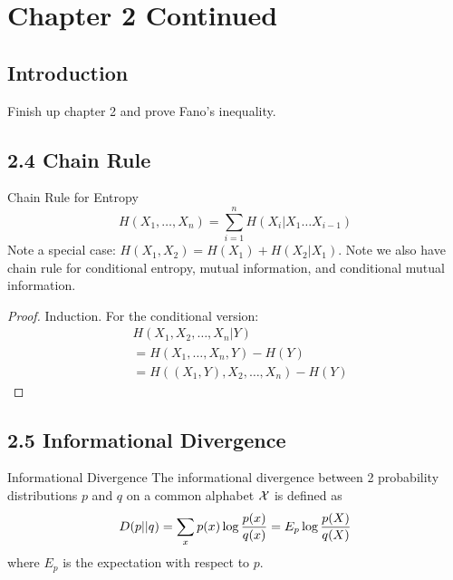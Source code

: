 \documentclass[../main.tex]{subfiles}
\begin{document}
\chapter{Chapter 2 Continued}
\section*{Introduction}
    Finish up chapter 2 and prove Fano's inequality.
\section{2.4 Chain Rule}
    \begin{bbox}{Chain Rule for Entropy}
        \begin{equation*}
            H(X_1,\dots,X_n)=\sum_{i=1}^{n}H(X_i|X_1\dots X_{i-1})
        \end{equation*}
        Note a special case: $H(X_1, X_2)=H(X_1)+H(X_2|X_1)$.
        Note we also have chain rule for conditional entropy, mutual information, and conditional mutual information.
        \begin{proof}
        Induction.
        For the conditional version:
            \begin{align*}
                &H(X_1,X_2,\dots,X_n|Y)\\
                &=H(X_1,\dots,X_n,Y)-H(Y)\\
                &=H((X_1,Y),X_2,\dots,X_n)-H(Y)
            \end{align*}    
        \end{proof}
    \end{bbox}

\section{2.5 Informational Divergence}
    
    \begin{gbox}{Informational Divergence}
        The informational divergence between 2 probability distributions $p$ and $q$ on a common alphabet $\mathcal{X}$ is defined as \begin{equation}
            D(p||q) = \sum_x p(x)\log\frac{p(x)}{q(x)} = E_p \log\frac{p(X)}{q(X)}
        \end{equation} where $E_p$ is the expectation with respect to $p$.
    \end{gbox}
\end{document}
